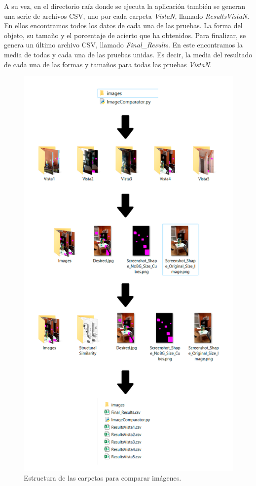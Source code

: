 \begin{itemize}
    A su vez, en el directorio raíz donde se ejecuta la aplicación también se generan una serie de archivos CSV, uno por cada carpeta \textit{VistaN}, llamado \textit{ResultsVistaN}. En ellos encontramos todos los datos de cada una de las pruebas. La forma del objeto, su tamaño y el porcentaje de acierto que ha obtenidos. Para finalizar, se genera un último archivo CSV, llamado \textit{Final\_Results}. En este encontramos la media de todas y cada una de las pruebas unidas. Es decir, la media del resultado de cada una de las formas y tamaños para todas las pruebas \textit{VistaN}. 
    
    \begin{figure}[H]
    \centering
    \includegraphics[scale=0.20]{Images/NubeDePuntos/CarpetasPruebas.png}
    \caption[Estructura de las carpetas para comparar imágenes.]{Estructura de las carpetas para comparar imágenes.}
    \label{fig:CarpetasPruebas}
    \end{figure} 
    
\end{itemize}


